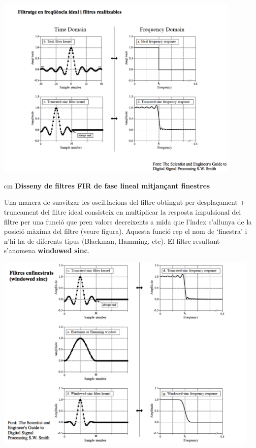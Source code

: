 \documentclass{article}
\begin{document}
\begin{center}
\includegraphics[width=12cm]{filtreidealrealitzable.png}
\end{center}


 cm
\textbf{Disseny de filtres FIR de fase lineal mitjançant finestres}

Una manera de suavitzar les oscil.lacions del filtre obtingut per desplaçament + truncament del filtre ideal 
consisteix en multiplicar la resposta impulsional del filtre per una funció que pren valors decreixents a mida que l'índex 
s'allunya de la posició màxima del filtre (veure figura). 
Aquesta funció rep el nom de `finestra' i n'hi ha de diferents tipus (Blackman, Hamming, etc).
El filtre resultant s'anomena \textbf{windowed sinc}.

\begin{center}
\includegraphics[width=13cm]{windowedsinc.png}
\end{center}
\end{document}
